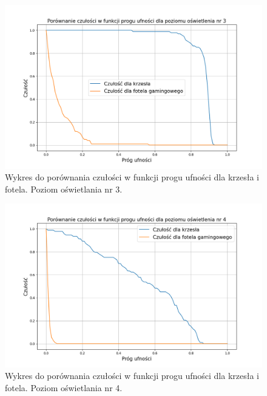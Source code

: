 \begin{figure}[H]
    \centering
    \includegraphics[width=\linewidth]{r_test_dokładności/chair_charts/3.png}
    \caption{Wykres do porównania czułości w funkcji progu ufności dla krzesła i fotela. Poziom oświetlania nr 3.}
    \label{fig:chair-game-3}
\end{figure}

\begin{figure}[H]
    \centering
    \includegraphics[width=\linewidth]{r_test_dokładności/chair_charts/4.png}
    \caption{Wykres do porównania czułości w funkcji progu ufności dla krzesła i fotela. Poziom oświetlania nr 4.}
    \label{fig:chair-game-4}
\end{figure}

